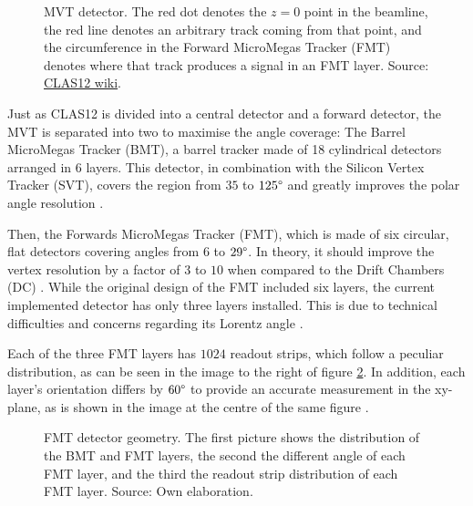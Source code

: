     \begin{figure}[b!]
        \centering{}
        \caption[MVT detector.]{MVT detector.
        The red dot denotes the $z=0$ point in the beamline, the red line denotes an arbitrary track coming from that point, and the circumference in the Forward MicroMegas Tracker (FMT) denotes where that track produces a signal in an FMT layer.
        Source: \hyperlink{https://www.jlab.org/physics/hall-b/clas12}{CLAS12 wiki}.}
        \label{fig::mvt}
    \end{figure}

    Just as CLAS12 is divided into a central detector and a forward detector, the MVT is separated into two to maximise the angle coverage:
    The Barrel MicroMegas Tracker (BMT), a barrel tracker made of 18 cylindrical detectors arranged in 6 layers.
    This detector, in combination with the Silicon Vertex Tracker (SVT), covers the region from $35$ to $125\degree$ and greatly improves the polar angle resolution \cite{acker2020mvt}.

    Then, the Forwards MicroMegas Tracker (FMT), which is made of six circular, flat detectors covering angles from $6$ to $29\degree$.
    In theory, it should improve the vertex resolution by a factor of $3$ to $10$ when compared to the Drift Chambers (DC) \cite{aune2009}.
    While the original design of the FMT included six layers, the current implemented detector has only three layers installed.
    This is due to technical difficulties and concerns regarding its Lorentz angle \cite{konczykowski2010}.

    Each of the three FMT layers has $1024$ readout strips, which follow a peculiar distribution, as can be seen in the image to the right of figure \ref{fig::fmt_geometry}.
    In addition, each layer's orientation differs by $60\degree$ to provide an accurate measurement in the xy-plane, as is shown in the image at the centre of the same figure \cite{acker2020mvt}.

    \begin{figure}[t]
        \centering{}
        \caption[FMT detector geometry.]{FMT detector geometry. The first picture shows the distribution of the BMT and FMT layers, the second the different angle of each FMT layer, and the third the readout strip distribution of each FMT layer.
        Source: Own elaboration.}
        \label{fig::fmt_geometry}
    \end{figure}

